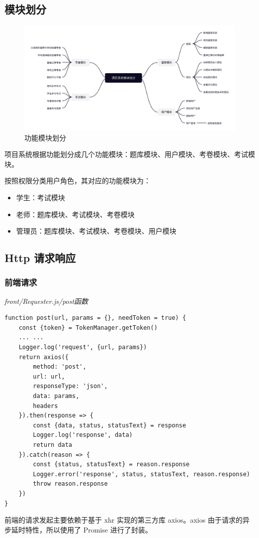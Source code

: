 \subsection{模块划分}
\begin{figure}[htb]
    \centering
    \includegraphics[width=\linewidth]{_images/功能模块划分.png}
    \caption{功能模块划分}
\end{figure}
项目系统根据功能划分成几个功能模块：题库模块、用户模块、考卷模块、考试模块。

按照权限分类用户角色，其对应的功能模块为：
\begin{itemize}
    \item 学生：考试模块
    \item 老师：题库模块、考试模块、考卷模块
    \item 管理员：题库模块、考试模块、考卷模块、用户模块
\end{itemize}

\subsection{Http 请求响应}
\subsubsection{前端请求}
\noindent\textit{front/Requester.js/post函数}
\begin{lstlisting}
function post(url, params = {}, needToken = true) {
    const {token} = TokenManager.getToken()
    ... ...
    Logger.log('request', {url, params})
    return axios({
        method: 'post',
        url: url,
        responseType: 'json',
        data: params,
        headers
    }).then(response => {
        const {data, status, statusText} = response
        Logger.log('response', data)
        return data
    }).catch(reason => {
        const {status, statusText} = reason.response
        Logger.error('response', status, statusText, reason.response)
        throw reason.response
    })
}
\end{lstlisting}
前端的请求发起主要依赖于基于 xhr 实现的第三方库 axios。axios 由于请求的异步延时特性，所以使用了 Promise 进行了封装。

